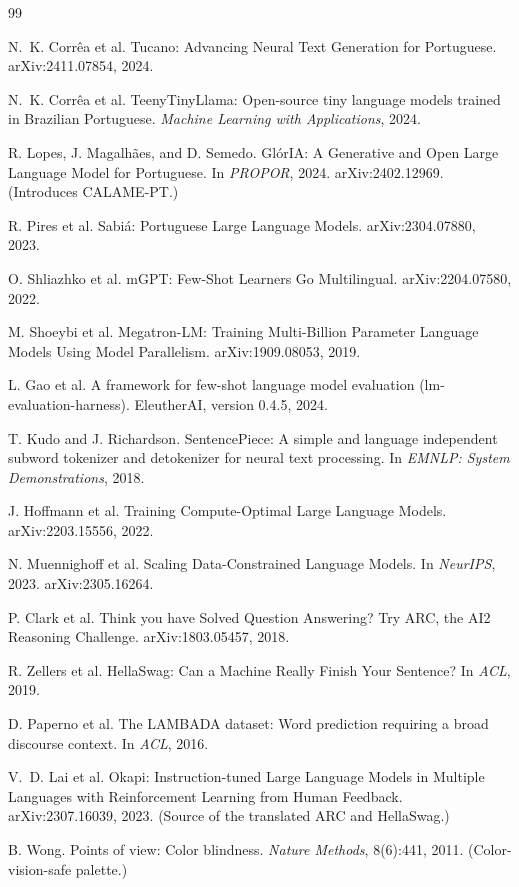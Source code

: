 \documentclass[11pt]{article}
\begin{document}
\begin{thebibliography}{99}
\small

 N.~K. Corr\^ea et al.
\newblock Tucano: Advancing Neural Text Generation for Portuguese.
\newblock arXiv:2411.07854, 2024.

 N.~K. Corr\^ea et al.
\newblock TeenyTinyLlama: Open-source tiny language models trained in Brazilian
Portuguese.
\newblock \emph{Machine Learning with Applications}, 2024.

 R. Lopes, J. Magalh\~aes, and D. Semedo.
\newblock Gl\'orIA: A Generative and Open Large Language Model for Portuguese.
\newblock In \emph{PROPOR}, 2024. arXiv:2402.12969. (Introduces CALAME-PT.)

 R. Pires et al.
\newblock Sabi\'a: Portuguese Large Language Models.
\newblock arXiv:2304.07880, 2023.

 O. Shliazhko et al.
\newblock mGPT: Few-Shot Learners Go Multilingual.
\newblock arXiv:2204.07580, 2022.

 M. Shoeybi et al.
\newblock Megatron-LM: Training Multi-Billion Parameter Language Models Using Model
Parallelism.
\newblock arXiv:1909.08053, 2019.

 L. Gao et al.
\newblock A framework for few-shot language model evaluation (lm-evaluation-harness).
\newblock EleutherAI, version 0.4.5, 2024.

 T. Kudo and J. Richardson.
\newblock SentencePiece: A simple and language independent subword tokenizer and
detokenizer for neural text processing.
\newblock In \emph{EMNLP: System Demonstrations}, 2018.

 J. Hoffmann et al.
\newblock Training Compute-Optimal Large Language Models.
\newblock arXiv:2203.15556, 2022.

 N. Muennighoff et al.
\newblock Scaling Data-Constrained Language Models.
\newblock In \emph{NeurIPS}, 2023. arXiv:2305.16264.

 P. Clark et al.
\newblock Think you have Solved Question Answering? Try ARC, the AI2 Reasoning
Challenge.
\newblock arXiv:1803.05457, 2018.

 R. Zellers et al.
\newblock HellaSwag: Can a Machine Really Finish Your Sentence?
\newblock In \emph{ACL}, 2019.

 D. Paperno et al.
\newblock The LAMBADA dataset: Word prediction requiring a broad discourse context.
\newblock In \emph{ACL}, 2016.

 V.~D. Lai et al.
\newblock Okapi: Instruction-tuned Large Language Models in Multiple Languages with
Reinforcement Learning from Human Feedback.
\newblock arXiv:2307.16039, 2023. (Source of the translated ARC and HellaSwag.)

 B. Wong.
\newblock Points of view: Color blindness.
\newblock \emph{Nature Methods}, 8(6):441, 2011. (Color-vision-safe palette.)

\end{thebibliography}
\end{document}
